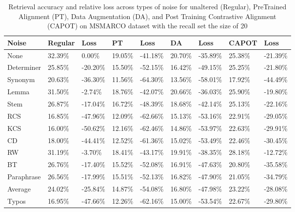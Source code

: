 \begin{table*}[!ht]
    \centering
    
    \begin{tabular}{|l|l|l|l|l|l|l|l|l|}
    \hline
        Noise & Regular & Loss & PT & Loss & DA & Loss & CAPOT & Loss \\ \hline
        None & 32.39\% & 0.00\% & 19.05\% & -41.18\% & 20.70\% & -35.89\% & 25.38\% & -21.39\% \\ \hline
        Determiner & 25.85\% & -20.20\% & 15.50\% & -52.15\% & 16.42\% & -49.15\% & 25.25\% & -21.80\% \\ \hline
        Synonym & 20.63\% & -36.30\% & 11.56\% & -64.30\% & 13.56\% & -58.01\% & 17.92\% & -44.49\% \\ \hline
        Lemma & 31.50\% & -2.74\% & 18.76\% & -42.07\% & 20.66\% & -36.03\% & 25.90\% & -19.80\% \\ \hline
        Stem & 26.87\% & -17.04\% & 16.72\% & -48.39\% & 18.68\% & -42.14\% & 25.13\% & -22.16\% \\ \hline
        RCS & 16.85\% & -47.96\% & 12.09\% & -62.66\% & 15.13\% & -53.16\% & 22.91\% & -29.05\% \\ \hline
        KCS & 16.00\% & -50.62\% & 12.16\% & -62.46\% & 14.86\% & -53.97\% & 22.63\% & -29.91\% \\ \hline
        CD & 18.00\% & -44.41\% & 12.52\% & -61.36\% & 15.02\% & -53.49\% & 22.46\% & -30.45\% \\ \hline
        RW & 31.19\% & -3.70\% & 18.41\% & -43.17\% & 19.91\% & -38.35\% & 28.18\% & -12.72\% \\ \hline
        BT & 26.76\% & -17.40\% & 15.52\% & -52.08\% & 16.91\% & -47.63\% & 20.80\% & -35.58\% \\ \hline
        Paraphrase & 26.56\% & -17.99\% & 15.51\% & -52.13\% & 16.82\% & -47.90\% & 21.05\% & -34.79\% \\ \hline
        Average & 24.02\% & -25.84\% & 14.87\% & -54.08\% & 16.80\% & -47.98\% & 23.22\% & -28.08\% \\ \hline
        Typos & 16.95\% & -47.66\% & 12.26\% & -62.16\% & 15.00\% & -53.54\% & 22.67\% & -29.80\% \\ \hline
    \end{tabular}
    \caption{Retrieval accuracy and relative loss across types of noise for unaltered (Regular), PreTrained Alignment (PT),  Data Augmentation (DA), and Post Training Contrastive Alignment (CAPOT) on MSMARCO dataset with the recall set the size of 20}
    \label{tab:capot-msmarco-20}
\end{table*}
